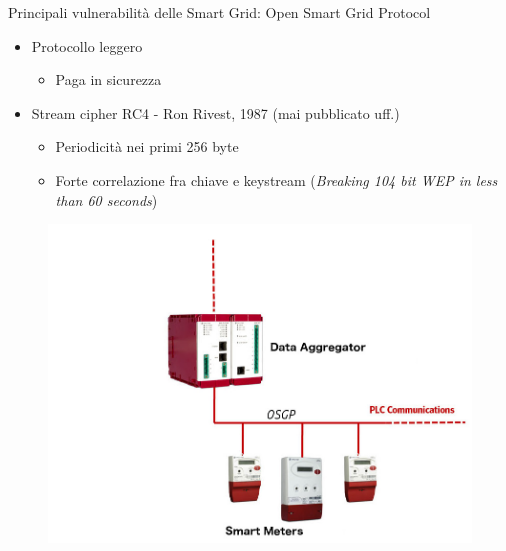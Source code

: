 \begin{frame}{Principali vulnerabilità delle Smart Grid: Open Smart Grid Protocol}
	\begin{itemize}[<+- | alert@+>]
		\item Protocollo leggero
		\begin{itemize}
			\item Paga in sicurezza
		\end{itemize}
		\item Stream cipher RC4 - Ron Rivest, 1987 (mai pubblicato uff.)
		\begin{itemize}
			\item Periodicità nei primi 256 byte
			\item Forte correlazione fra chiave e keystream (\textit{Breaking 104 bit WEP in less than 60 seconds})
		\end{itemize}
	\end{itemize}
	\begin{figure}[h] 
		\includegraphics[scale=0.15,cfbox=blue_slides 1pt 0pt]{imgs/aggregator.jpg}
	\end{figure}
\end{frame}

